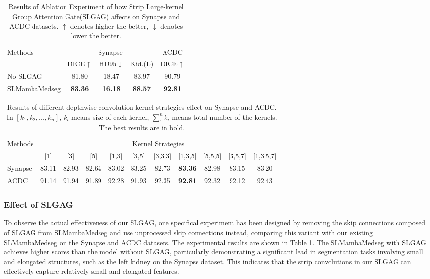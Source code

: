 \documentclass[letterpaper, 10 pt, conference]{ieeeconf}  %
\begin{document}
\begin{table}[h]
\footnotesize
\centering
\begin{tabular}{l|ccc|c}\hline
\multirow{2}{*}{Methods} & \multicolumn{3}{c|}{Synapse} & ACDC \\\cline{2-5}
& DICE$\uparrow$ & HD95$\downarrow$ &Kid.(L) & DICE$\uparrow$ \\\hline
No-SLGAG & 81.80 & 18.47 &83.97  & 90.79\\\hline
SLMambaMedseg & \textbf{83.36} & \textbf{16.18} &\textbf{88.57}  & \textbf{92.81} \\\hline
\end{tabular}
\caption{Results of Ablation Experiment of how Strip Large-kernel Group Attention Gate(SLGAG) affects on Synapse and ACDC datasets. $\uparrow$ denotes higher the better, $\downarrow$ denotes lower the better.}
\label{table4}
\end{table}

\begin{table}[h]
\small
\centering
\begin{tabular}{l|cccccccccc}\hline
\multirow{2}{*}{Methods} & \multicolumn{10}{c}{Kernel Strategies} \\\cline{2-11}
& [1] & [3] & [5] & [1,3] & [3,5] & [3,3,3] &[1,3,5]& [5,5,5] &[3,5,7] &[1,3,5,7]  \\\hline
Synapse& 83.11& 82.93& 82.64& 83.02& 83.25& 82.73 & \textbf{83.36}& 82.98& 83.15& 83.20 \\
ACDC & 91.14 &91.94 & 91.89 &92.28& 91.93& 92.35& \textbf{92.81}& 92.32& 92.12& 92.43\\
\hline
\end{tabular}
\caption{Results of different depthwise convolution kernel strategies effect on Synapse and ACDC. In $[k_{1},k_{2},...,k_{n}]$, $k_{i}$ means size of each kernel, $\sum_{1}^{n}k_{i}$ means total number of the kernels. The best results are in bold.}
\label{table5}
\end{table}


\subsubsection{Effect of SLGAG}

To observe the actual effectiveness of our SLGAG, one specifical experiment has been designed by removing the skip connections composed of SLGAG from SLMambaMedseg and use unprocessed skip connections instead, comparing this variant with our existing SLMambaMedseg on the Synapse and ACDC datasets. The experimental results are shown in Table \textcolor{red}{\ref{table4}}. The SLMambaMedseg with SLGAG achieves higher scores than the model without SLGAG, particularly demonstrating a significant lead in segmentation tasks involving small and elongated structures, such as the left kidney on the Synapse dataset. This indicates that the strip convolutions in our SLGAG can effectively capture relatively small and elongated features.
\end{document}
